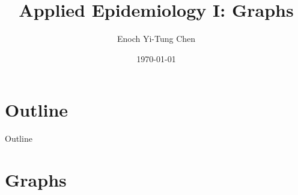 


\title[Applied Epi I: Graphs]{Applied Epidemiology I: Graphs}
\date{\today}
\author[Enoch Yi-Tung Chen]{Enoch Yi-Tung Chen}




\begin{frame}
\maketitle 
\end{frame}




\section*{Outline}
\begin{frame}{Outline}
          \tableofcontents
\end{frame}

\section{Graphs}
